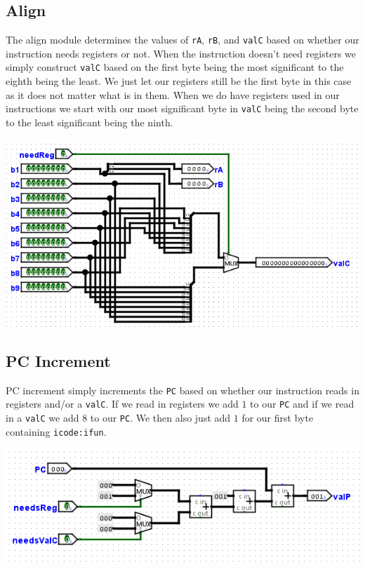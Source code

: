 \documentclass{article}
\begin{document}
\subsection{Align}
The align module determines the values of \verb+rA+, \verb+rB+, and \verb+valC+ based on whether our instruction needs registers or not. When the instruction doesn't need registers we simply construct  \verb+valC+ based on the first byte being the most significant to the eighth being the least. We just let our registers still be the first byte in this case as it does not matter what is in them. When we do have registers used in our instructions we start with our most significant byte in \verb+valC+ being the second byte to the least significant being the ninth.
\begin{center}
    \includegraphics[scale=.7]{align.png}
\end{center}
\subsection{PC Increment}
PC increment simply increments the \verb+PC+ based on whether our instruction reads in registers and/or a \verb+valC+. If we read in registers we add $1$ to our \verb+PC+ and if we read in a \verb+valC+ we add $8$ to our \verb+PC+. We then also just add $1$ for our first byte containing  \verb+icode:ifun+.
\begin{center}
    \includegraphics[scale=.6]{pcInc.png}
\end{center}
\end{document}
